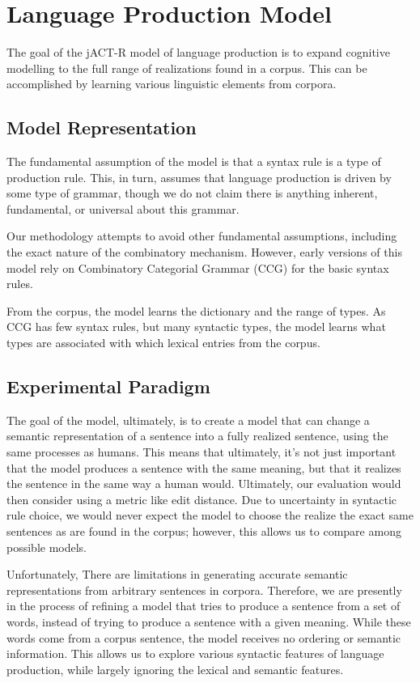 \section{Language Production Model}
The goal of the jACT-­R model of language production is to expand cognitive modelling to the full range of realizations found in a corpus. This can be accomplished by learning various linguistic elements from corpora.

\subsection{Model Representation}
The fundamental assumption of the model is that a syntax rule is a type of production rule. This, in turn, assumes that language production is driven by some type of grammar, though we do not claim there is anything inherent, fundamental, or universal about this grammar.

Our methodology attempts to avoid other fundamental assumptions, including the exact nature of the combinatory mechanism. However, early versions of this model rely on Combinatory Categorial Grammar (CCG) \cite{ccg} for the basic syntax rules.

From the corpus, the model learns the dictionary and the range of types. As CCG has few syntax rules, but many syntactic types, the model learns what types are associated with which lexical entries from the corpus.

\subsection{Experimental Paradigm}
The goal of the model, ultimately, is to create a model that can change a semantic representation of a sentence into a fully realized sentence, using the same processes as humans. This means that ultimately, it's not just important that the model produces a sentence with the same meaning, but that it realizes the sentence in the same way a human would. Ultimately, our evaluation would then consider using a metric like edit distance. Due to uncertainty in syntactic rule choice, we would never expect the model to choose the realize the exact same sentences as are found in the corpus; however, this allows us to compare among possible models.

Unfortunately, There are limitations in generating accurate semantic representations from arbitrary sentences in corpora. Therefore, we are presently in the process of refining a model that tries to produce a sentence from a set of words, instead of trying to produce a sentence with a given meaning. While these words come from a corpus sentence, the model receives no ordering or semantic information. This allows us to explore various syntactic features of language production, while largely ignoring the lexical and semantic features.

